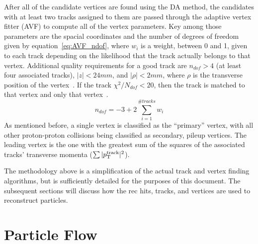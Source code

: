 After all of the candidate vertices are found using the DA method, the candidates with at least two tracks assigned to them are passed through the adaptive vertex fitter (AVF) to compute all of the vertex parameters.
Key among those parameters are the spacial coordinates and the number of degrees of freedom given by equation~\ref{eq:AVF_ndof}, where $w_{i}$ is a weight, between 0 and 1, given to each track depending on the likelihood that the track actually belongs to that vertex.
Additional quality requirements for a good track are $n_{dof}>4$ (at least four associated tracks), $|z|<24\unit{mm}$, and $|\rho|<2\unit{mm}$, where $\rho$ is the transverse position of the vertex~\cite{CMS-PAS-TRK-10-005}. If the track $\chi^{2}/N_{dof}<20$, then the track is matched to that vertex and only that vertex~\cite{Khachatryan:2198719}.
\begin{equation}
    \label{eq:AVF_ndof}
    n_{dof}=-3+2\sum_{i=1}^{\#tracks}w_{i}%
\end{equation}
As mentioned before, a single vertex is classified as the ``primary'' vertex, with all other proton-proton collisions being classified as secondary, pileup vertices. The leading vertex is the one with the greatest sum of the squares of the associated tracks' transverse momenta ($\sum|{p}_{\mathrm{T}}^{\mathrm{track}}|^{2}$).

The methodology above is a simplification of the actual track and vertex finding algorithms, but is sufficiently detailed for the purposes of this document. The subsequent sections will discuss how the rec hits, tracks, and vertices are used to reconstruct particles.

\section{Particle Flow}
\label{sec:particle_flow}

